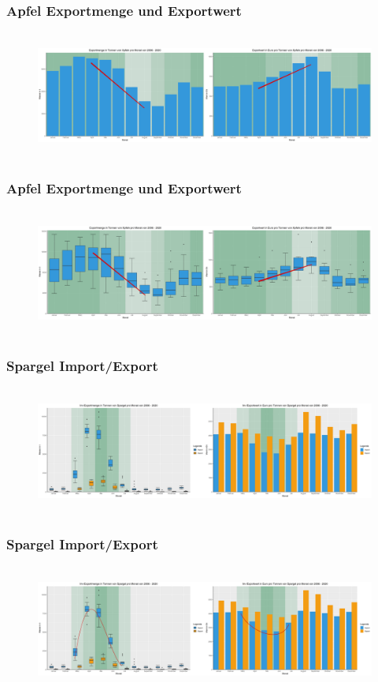 \documentclass{beamer}
\begin{document}
\begin{frame}
\frametitle{Apfel Exportmenge und Exportwert}
  \begin{figure}[h]
    \hbox{\hspace{-1cm}
    \includegraphics[width=12.5cm]{1_apfel_gegenlaeufig1}
    }
  \end{figure}
\end{frame}

\begin{frame}
\frametitle{Apfel Exportmenge und Exportwert}
  \begin{figure}[h]
    \hbox{\hspace{-1cm}
    \includegraphics[width=12.5cm]{1_apfel_gegenlaeufig2}
    }
  \end{figure}
\end{frame}

\begin{frame}
\frametitle{Spargel Import/Export}
  \begin{figure}[h]
    \hbox{\hspace{-1cm}
    \includegraphics[width=12.5cm]{3_spargel_import1}
    }
  \end{figure}
\end{frame}

\begin{frame}
\frametitle{Spargel Import/Export}
  \begin{figure}[h]
    \hbox{\hspace{-1cm}
    \includegraphics[width=12.5cm]{3_spargel_import2}
    }
  \end{figure}
\end{frame}
\end{document}
